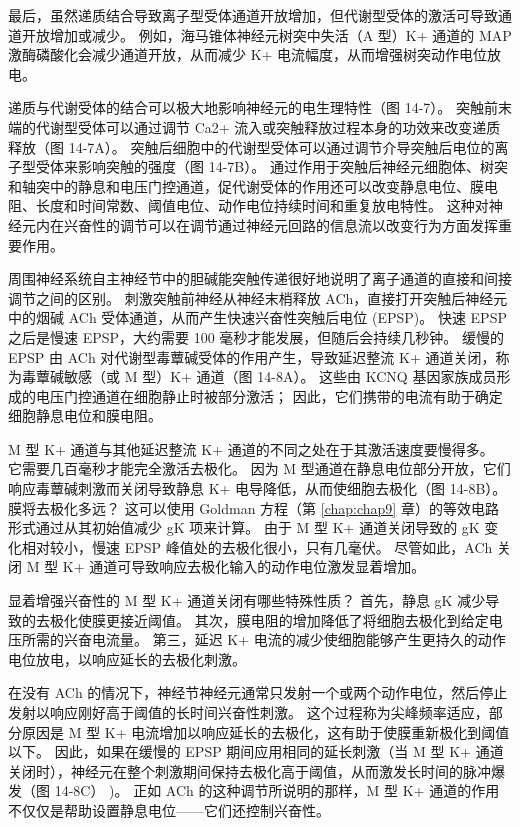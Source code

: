 最后，虽然递质结合导致离子型受体通道开放增加，但代谢型受体的激活可导致通道开放增加或减少。 
例如，海马锥体神经元树突中失活（A 型）K+ 通道的 MAP 激酶磷酸化会减少通道开放，从而减少 K+ 电流幅度，从而增强树突动作电位放电。


递质与代谢受体的结合可以极大地影响神经元的电生理特性（图 14-7）。 
突触前末端的代谢型受体可以通过调节 Ca2+ 流入或突触释放过程本身的功效来改变递质释放（图 14-7A）。 
突触后细胞中的代谢型受体可以通过调节介导突触后电位的离子型受体来影响突触的强度（图 14-7B）。
通过作用于突触后神经元细胞体、树突和轴突中的静息和电压门控通道，促代谢受体的作用还可以改变静息电位、膜电阻、长度和时间常数、阈值电位、动作电位持续时间和重复放电特性。
这种对神经元内在兴奋性的调节可以在调节通过神经元回路的信息流以改变行为方面发挥重要作用。


周围神经系统自主神经节中的胆碱能突触传递很好地说明了离子通道的直接和间接调节之间的区别。
刺激突触前神经从神经末梢释放 ACh，直接打开突触后神经元中的烟碱 ACh 受体通道，从而产生快速兴奋性突触后电位 (EPSP)。 
快速 EPSP 之后是慢速 EPSP，大约需要 100 毫秒才能发展，但随后会持续几秒钟。 
缓慢的 EPSP 由 ACh 对代谢型毒蕈碱受体的作用产生，导致延迟整流 K+ 通道关闭，称为毒蕈碱敏感（或 M 型）K+ 通道（图 14-8A）。 
这些由 KCNQ 基因家族成员形成的电压门控通道在细胞静止时被部分激活； 
因此，它们携带的电流有助于确定细胞静息电位和膜电阻。


M 型 K+ 通道与其他延迟整流 K+ 通道的不同之处在于其激活速度要慢得多。 
它需要几百毫秒才能完全激活去极化。 
因为 M 型通道在静息电位部分开放，它们响应毒蕈碱刺激而关闭导致静息 K+ 电导降低，从而使细胞去极化（图 14-8B）。 
膜将去极化多远？ 这可以使用 Goldman 方程（第 \ref{chap:chap9} 章）的等效电路形式通过从其初始值减少 gK 项来计算。 
由于 M 型 K+ 通道关闭导致的 gK 变化相对较小，慢速 EPSP 峰值处的去极化很小，只有几毫伏。 
尽管如此，ACh 关闭 M 型 K+ 通道可导致响应去极化输入的动作电位激发显着增加。


显着增强兴奋性的 M 型 K+ 通道关闭有哪些特殊性质？ 
首先，静息 gK 减少导致的去极化使膜更接近阈值。 
其次，膜电阻的增加降低了将细胞去极化到给定电压所需的兴奋电流量。 
第三，延迟 K+ 电流的减少使细胞能够产生更持久的动作电位放电，以响应延长的去极化刺激。


在没有 ACh 的情况下，神经节神经元通常只发射一个或两个动作电位，然后停止发射以响应刚好高于阈值的长时间兴奋性刺激。 这个过程称为尖峰频率适应，部分原因是 M 型 K+ 电流增加以响应延长的去极化，这有助于使膜重新极化到阈值以下。 
因此，如果在缓慢的 EPSP 期间应用相同的延长刺激（当 M 型 K+ 通道关闭时），神经元在整个刺激期间保持去极化高于阈值，从而激发长时间的脉冲爆发（图 14-8C） )。
正如 ACh 的这种调节所说明的那样，M 型 K+ 通道的作用不仅仅是帮助设置静息电位——它们还控制兴奋性。


